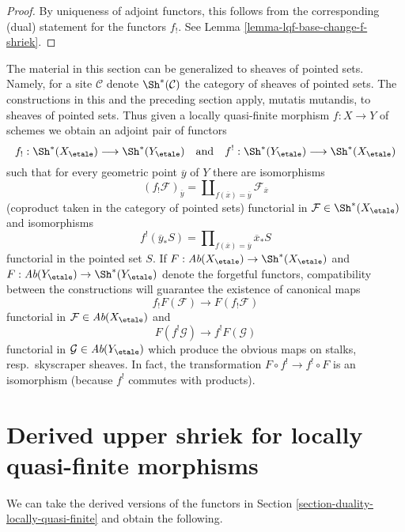\begin{proof}
By uniqueness of adjoint functors, this follows from
the corresponding (dual) statement for the functors $f_!$.
See Lemma \ref{lemma-lqf-base-change-f-shriek}.
\end{proof}

\begin{remark}
\label{remark-pointed-sets}
The material in this section can be generalized to sheaves of pointed sets.
Namely, for a site $\mathcal{C}$ denote $\Sh^*(\mathcal{C})$ the category of
sheaves of pointed sets. The constructions in this and the preceding section
apply, mutatis mutandis, to sheaves of pointed sets. Thus given a locally
quasi-finite morphism $f : X \to Y$ of schemes we obtain
an adjoint pair of functors
$$
f_! : \Sh^*(X_\etale) \longrightarrow \Sh^*(Y_\etale)
\quad\text{and}\quad
f^! : \Sh^*(Y_\etale) \longrightarrow \Sh^*(X_\etale)
$$
such that for every geometric point $\overline{y}$ of $Y$ there are
isomorphisms
$$
(f_!\mathcal{F})_{\overline{y}} =
\coprod\nolimits_{f(\overline{x}) = \overline{y}}
\mathcal{F}_{\overline{x}}
$$
(coproduct taken in the category of pointed sets) functorial in
$\mathcal{F} \in \Sh^*(X_\etale)$ and isomorphisms
$$
f^!(\overline{y}_*S) =
\prod\nolimits_{f(\overline{x}) = \overline{y}}
\overline{x}_*S
$$
functorial in the pointed set $S$. If
$F : \textit{Ab}(X_\etale) \to \Sh^*(X_\etale)$ and
$F : \textit{Ab}(Y_\etale) \to \Sh^*(Y_\etale)$
denote the forgetful functors, compatibility between the constructions
will guarantee the existence of canonical maps
$$
f_!F(\mathcal{F}) \longrightarrow F(f_!\mathcal{F})
$$
functorial in $\mathcal{F} \in \textit{Ab}(X_\etale)$ and
$$
F(f^!\mathcal{G}) \longrightarrow f^!F(\mathcal{G})
$$
functorial in $\mathcal{G} \in \textit{Ab}(Y_\etale)$
which produce the obvious maps on stalks, resp.\ skyscraper sheaves.
In fact, the transformation $F \circ f^! \to f^! \circ F$ is an isomorphism
(because $f^!$ commutes with products).
\end{remark}







\section{Derived upper shriek for locally quasi-finite morphisms}
\label{section-derived-duality-locally-quasi-finite}

\noindent
We can take the derived versions of the functors in
Section \ref{section-duality-locally-quasi-finite}
and obtain the following.

